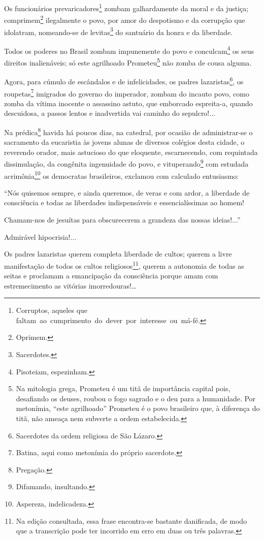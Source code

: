 Os funcionários prevaricadores\footnote{Corruptos, aqueles que
  faltam~ao~cumprimento~do~dever~por~interesse~ou~má-fé.} zombam
galhardamente da moral e da justiça; comprimem\footnote{Oprimem.}
ilegalmente o povo, por amor do despotismo e da corrupção que idolatram,
nomeando-se de levitas\footnote{Sacerdotes.} do santuário da honra e
da liberdade.

Todos os poderes no Brasil zombam impunemente do povo e
conculcam\footnote{Pisoteiam, espezinham.} os seus direitos
inalienáveis; só este agrilhoado Prometeu\footnote{Na mitologia grega,
  Prometeu é um titã de importância capital pois, desafiando os deuses,
  roubou o fogo sagrado e o deu para a humanidade. Por metonímia, ``este
  agrilhoado'' Prometeu é o povo brasileiro que, à diferença do titã, não
  ameaça nem subverte a ordem estabelecida.} não zomba de cousa alguma.

Agora, para cúmulo de escândalos e de infelicidades, os padres
lazaristas\footnote{Sacerdotes da ordem religiosa de São Lázaro.}, os
roupetas\footnote{Batina, aqui como metonímia do próprio sacerdote.}
imigrados do governo do imperador, zombam do incauto povo, como zomba da
vítima inocente o assassino astuto, que emborcado espreita-a, quando
descuidosa, a passos lentos e inadvertida vai caminho do sepulcro!...

Na prédica\footnote{Pregação.} havida há poucos dias, na catedral, por
ocasião de administrar-se o sacramento da eucaristia às jovens alunas de
diversos colégios desta cidade, o reverendo orador, mais astucioso do
que eloquente, escarnecendo, com requintada dissimulação, da congênita
ingenuidade do povo, e vituperando\footnote{Difamando, insultando.}
com estudada acrimônia\footnote{Aspereza, indelicadeza.} os democratas
brasileiros, exclamou com calculado entusiasmo:

``Nós quisemos sempre, e ainda queremos, de veras e com ardor, a
liberdade de consciência e todas as liberdades indispensáveis e
essencialíssimas ao homem!

Chamam-nos de jesuítas para obscurecerem a grandeza das nossas
ideias!...''

Admirável hipocrisia!...

Os padres lazaristas querem completa liberdade de cultos; querem a livre
manifestação de todos os cultos religiosos\footnote{Na edição
  consultada, essa frase encontra-se bastante danificada, de modo que a
  transcrição pode ter incorrido em erro em duas ou três palavras.},
querem a autonomia de todas as seitas e proclamam a emancipação da
consciência porque amam com estremecimento as vitórias
imorredouras!\ldots

